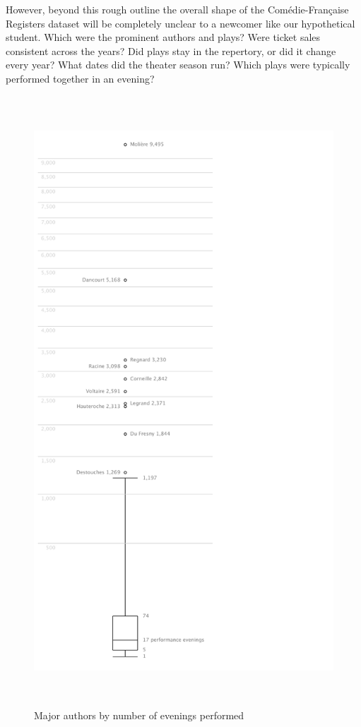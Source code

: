 \documentclass[	DIV=calc,%
							paper=a4,%
							fontsize=11pt,%
							twocolumn]{scrartcl}	 					%
\begin{document}
However, beyond this rough outline the overall shape of the Comédie-Française Registers dataset will be completely unclear to a newcomer like our hypothetical student.  Which were the prominent authors and plays? Were ticket sales consistent across the years?  Did plays stay in the repertory, or did it change every year?  What dates did the theater season run?  Which plays were typically performed together in an evening?

\begin{figure}
  \centering
  \includegraphics[height=9in]{viz/author_performances.pdf}
	\caption{Major authors by number of evenings performed}
  \label{fig:tukey_boxplot}
\end{figure}
\end{document}
